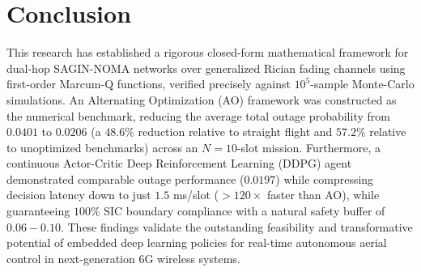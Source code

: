 \section{Conclusion}
\label{sec:conclusion}

This research has established a rigorous closed-form mathematical framework for dual-hop SAGIN-NOMA networks over generalized Rician fading channels using first-order Marcum-Q functions, verified precisely against $10^5$-sample Monte-Carlo simulations. An Alternating Optimization (AO) framework was constructed as the numerical benchmark, reducing the average total outage probability from $0.0401$ to $0.0206$ (a $48.6\%$ reduction relative to straight flight and $57.2\%$ relative to unoptimized benchmarks) across an $N = 10$-slot mission. Furthermore, a continuous Actor-Critic Deep Reinforcement Learning (DDPG) agent demonstrated comparable outage performance ($0.0197$) while compressing decision latency down to just $1.5$ ms/slot ($> 120\times$ faster than AO), while guaranteeing $100\%$ SIC boundary compliance with a natural safety buffer of $0.06 - 0.10$. These findings validate the outstanding feasibility and transformative potential of embedded deep learning policies for real-time autonomous aerial control in next-generation 6G wireless systems.
